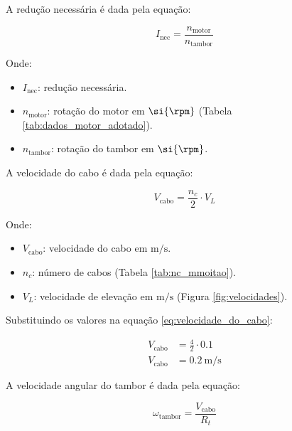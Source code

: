 A redução necessária é dada pela equação:

\begin{equation}
  I_{\text{nec}} = \frac{n_{\text{motor}}}{n_{\text{tambor}}}
  \label{eq:reducao_necessaria}
\end{equation}

Onde:

\begin{itemize}[leftmargin=1.25cm]
  \item $I_{\text{nec}}$: redução necessária.
  \item $n_{\text{motor}}$: rotação do motor em $\si{\rpm}$ (Tabela \ref{tab:dados_motor_adotado}).
  \item $n_{\text{tambor}}$: rotação do tambor em $\si{\rpm}$.
\end{itemize}

\vspace{1em}

A velocidade do cabo é dada pela equação:

\begin{equation}
  V_{\text{cabo}} = \frac{n_c}{2} \cdot V_L
  \label{eq:velocidade_do_cabo}
\end{equation}

Onde:

\begin{itemize}[leftmargin=1.25cm]
  \item $V_{\text{cabo}}$: velocidade do cabo em $\si{\meter\per\second}$.
  \item $n_c$: número de cabos (Tabela \ref{tab:nc_mmoitao}).
  \item $V_L$: velocidade de elevação em $\si{\meter\per\second}$ (Figura \ref{fig:velocidades}).
\end{itemize}

\vspace{1em}

Substituindo os valores na equação \eqref{eq:velocidade_do_cabo}:

\begin{align*}
  V_{\text{cabo}} & = \frac{4}{2} \cdot \num{0.1}              \\
  V_{\text{cabo}} & = \boxed{\SI{0.2}{\meter\per\second}}
\end{align*}

A velocidade angular do tambor é dada pela equação:

\begin{equation}
  \omega_{\text{tambor}} = \frac{V_{\text{cabo}}}{R_t}
  \label{eq:velocidade_angular_do_tambor}
\end{equation}

